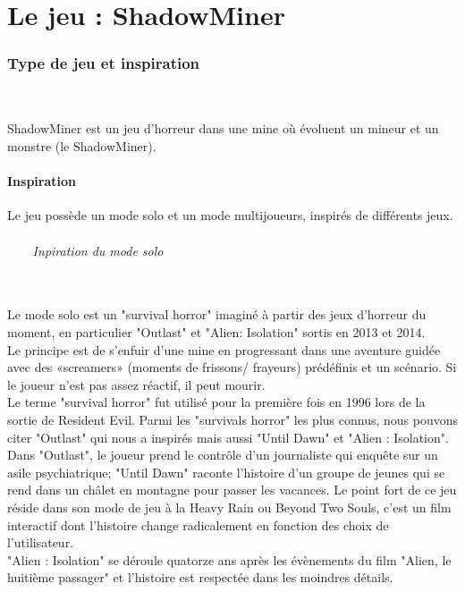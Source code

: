 \documentclass[titlepage, 13px, a4paper]{report}
\begin{document}
\newpage


\part{Le jeu : ShadowMiner}
\section{Type de jeu et inspiration}
\paragraph{} \hspace{0pt} \\
ShadowMiner est un jeu d’horreur dans une mine où évoluent un mineur et un monstre (le ShadowMiner). \\

\subsection{Inspiration}
Le jeu possède un mode solo et un mode multijoueurs, inspirés de différents jeux. \\
\paragraph{~~~~Inpiration du mode solo} \hspace{0pt} \\
Le mode solo est un "survival horror" imaginé à partir des jeux d'horreur du moment, 
en particulier "Outlast" et "Alien: Isolation" sortis en 2013 et 2014. 
\\
Le principe est de s'enfuir d'une mine en progressant dans une aventure guidée 
avec des «screamers» (moments de frissons/ frayeurs) prédéfinis et un scénario. 
Si le joueur n'est pas assez réactif, il peut mourir.
\\
Le terme "survival horror" fut utilisé pour la première fois en 1996 lors de la sortie 
de Resident Evil. Parmi les "survivals horror" les plus connus, nous pouvons citer "Outlast" qui 
nous a inspirés mais aussi "Until Dawn" et "Alien : Isolation". 
\\
Dans "Outlast", le joueur prend le contrôle d'un journaliste qui enquête sur un asile psychiatrique; 
"Until Dawn" raconte l'histoire d'un groupe de jeunes qui se rend dans un châlet 
en montagne pour passer les vacances. Le point fort de ce jeu réside dans son mode 
de jeu à la Heavy Rain ou Beyond Two Souls, c'est un film interactif dont l'histoire 
change radicalement en fonction des choix de l'utilisateur. 
\\
"Alien : Isolation" se déroule quatorze ans après les évènements du film "Alien, le huitième passager" 
et l'histoire est respectée dans les moindres détails. \\ \\
\end{document}
